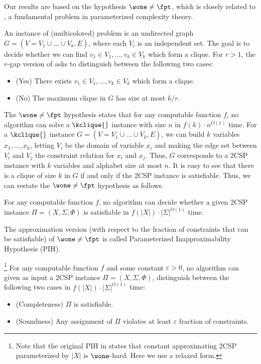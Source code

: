 Our results are based on the hypothesis $\wone \neq \fpt$, which is closely related to  \kclique{}, a fundamental problem in parameterized complexity theory. 
\begin{definition}[\kclique{}]
    An instance of (multicolored) \kclique{} problem is an undirected graph $G=(V=V_1\dot\cup\ldots\dot\cup V_k,E)$, where each $V_i$ is an independent set. The goal is to decide whether we can find $v_1 \in V_1,\ldots,v_k \in V_k$ which form a clique. For $r>1$, the $r$-gap version of \kclique{} asks to distinguish between the following two cases:
    \begin{itemize}
        \item (Yes) There exists $v_1 \in V_1,\ldots,v_k \in V_k$ which form a clique.
        \item (No) The maximum clique in $G$ has size at most $k/r$.
    \end{itemize}
\end{definition}

The $\wone\neq\fpt$ hypothesis states that for any computable function $f$, no algorithm can solve a $\kclique{}$ instance with size $n$ in $f(k)\cdot n^{O(1)}$ time. For a $\kclique{}$ instance $G=(V=V_1\dot\cup\ldots\dot\cup V_k,E)$, we can build $k$ variables $x_1,\ldots,x_k$, letting $V_i$ be the domain of variable $x_i$ and making the edge set between $V_i$ and $V_j$ the constraint relation for $x_i$ and $x_j$. Thus,  $G$ corresponds to a 2CSP instance with $k$ variables and alphabet size at most $n$. It is easy to see that there is a clique of size $k$ in $G$ if and only if the 2CSP instance is satisfiable. Thus, we can restate the $\wone\neq\fpt$ hypothesis as follows. 

\begin{hypothesis}[$\wone\neq\fpt$]
    For any computable function $f$, no algorithm can decide whether a given 2CSP instance $\Pi=(X,\Sigma,\Phi)$ is satisfiable in $f(|X|)\cdot |\Sigma|^{O(1)}$ time.
\end{hypothesis}

The approximation version (with respect to the fraction of constraints that can be satisfiable) of $\wone\neq\fpt$ is called Parameterized Inapproximability Hypothesis (PIH).
\begin{hypothesis} \footnote{Note that the original PIH in \cite{LRSZ20} states that constant approximating 2CSP parameterized by $|X|$ is $\wone$-hard. Here we use a relaxed form.}
    For any computable function $f$ and some constant $\varepsilon>0$, no algorithm can given as input a 2CSP instance $\Pi=(X,\Sigma,\Phi)$, distinguish between the following two cases in $f(|X|)\cdot |\Sigma|^{O(1)}$ time:
    \begin{itemize}
        \item (Completeness) $\Pi$ is satisfiable.
        \item (Soundness) Any assignment of $\Pi$ violates at least $\varepsilon$ fraction of constraints.
    \end{itemize}
\end{hypothesis}

